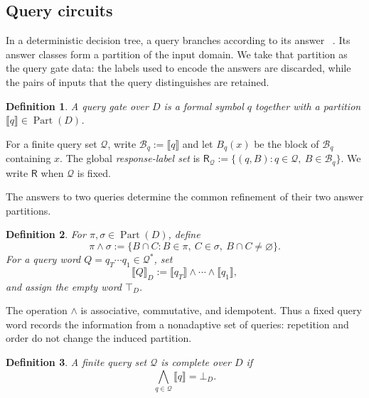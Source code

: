 \documentclass[11pt]{article}
\numberwithin{equation}{section}
\newtheorem{definition}{Definition}[section]
\theoremstyle{remark}
\newcommand{\Part}{\operatorname{Part}}
\begin{document}
\subsection{Query circuits}
\label{subsec:query-circuits}

In a deterministic decision tree, a query branches according to its answer
~\cite{BuhrmanDeWolf2002}. Its answer classes form a partition of
the input domain. We take that partition as the query gate data: the labels
used to encode the answers are discarded, while the pairs of inputs that the
query distinguishes are retained.

\begin{definition}
\label{def:query-gate}
A \emph{query gate} over $D$ is a formal symbol $q$ together with a
partition $\llbracket q\rrbracket\in\Part(D)$.  
\end{definition}

For a finite query set $\mathcal Q$, write
$\mathcal B_q:=\llbracket q\rrbracket$ and let $B_q(x)$ be the block of
$\mathcal B_q$ containing $x$. The global \emph{response-label set} is
$\mathsf R_{\mathcal Q}:=\{(q,B):q\in\mathcal Q,\ B\in\mathcal B_q\}$. We write $\mathsf R$ when $\mathcal Q$ is fixed.

The answers to two queries determine the common refinement of their two
answer partitions.

\begin{definition}
\label{def:common-refinement}
For $\pi,\sigma\in\Part(D)$, define
\begin{equation}
    \pi\wedge\sigma
    :=
    \{B\cap C:B\in\pi,\ C\in\sigma,\ B\cap C\neq\varnothing\}.
\end{equation}
For a query word $Q=q_T\cdots q_1\in\mathcal Q^*$, set
\begin{equation}
    \llbracket Q\rrbracket_D
    :=
    \llbracket q_T\rrbracket\wedge\cdots\wedge\llbracket q_1\rrbracket,
\end{equation}
and assign the empty word $\top_D$.
\end{definition}

The operation $\wedge$ is associative, commutative, and idempotent. Thus a
fixed query word records the information from a nonadaptive set of queries:
repetition and order do not change the induced partition.

\begin{definition}
\label{def:complete-query-set}
A finite query set $\mathcal Q$ is \emph{complete over $D$} if
\begin{equation}
    \bigwedge_{q\in\mathcal Q}\llbracket q\rrbracket=\bot_D.
\end{equation}
\end{definition}
\end{document}
